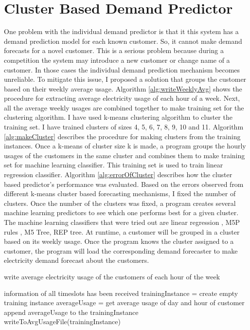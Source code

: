 \section{Cluster Based Demand Predictor}
One problem with the individual demand predictor is that it this system has a demand prediction model for each known customer. So, it cannot make demand forecasts for a novel customer. This is a serious problem because during a competition the system may introduce a new customer or change name of a customer. In those cases the individual demand prediction mechanism becomes unreliable. To mitigate this issue, I proposed a solution that groups the customer based on their weekly average usage. Algorithm \ref{alg:writeWeeklyAvg} shows the procedure for extracting average electricity usage of each hour of a week. Next, all the average weekly usages are combined together to make training set for the clustering algorithm. I have used k-means \cite{witten2005data} clustering algorithm to cluster the  training set. I have trained clusters of sizes 4, 5, 6, 7, 8, 9, 10 and 11. Algorithm \ref{alg:makeCluster} describes the procedure for making clusters from the training instances. Once a k-means of cluster size k is made, a program groups the hourly usages of the customers in the same cluster and combines them to make training set for  machine learning classifier. This training set is used to train linear regression classifier. Algorithm \ref{alg:errorOfCluster} describes how the cluster based predictor's performance was evaluated.
Based on the errors observed from different k-means cluster based forecasting mechanisms, I fixed the number of clusters. Once the number of the clusters was fixed, a program creates several machine learning predictors to see which one performs best for a given cluster. The machine learning classifiers that were tried out are linear regression \cite{witten2005data}, M5P rules \cite{witten2005data}, M5 Tree\cite{witten2005data}, REP tree\cite{witten2005data}. At runtime, a customer will be grouped in a cluster based on its weekly usage. Once the program knows the cluster assigned to a customer, the program will load the corresponding demand forecaster to make electricity demand forecast about the customers.

\begin{algorithm} [!h]
\caption{write average electricity usage of the customers of each hour of the week}
\begin{algorithmic} [1]
\REQUIRE information of all timeslots has been received
    \STATE trainingInstance = create empty training instance
            \STATE averageUsage = get average usage of day and hour of customer
            \STATE append averageUsage to the trainingInstance
        \ENDFOR
    \ENDFOR
    \STATE writeToAvgUsageFile(trainingInstance)
\ENDFOR
\end{algorithmic}
\label{alg:writeWeeklyAvg}
\end{algorithm}

